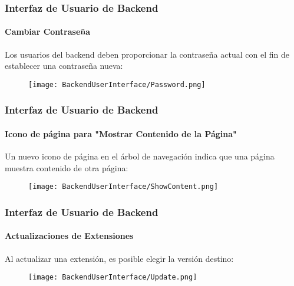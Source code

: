 \begin{frame}[fragile]
	\frametitle{Interfaz de Usuario de Backend}
	\framesubtitle{Cambiar Contraseña}

	Los usuarios del backend deben proporcionar la contraseña actual con el fin de
	establecer una contraseña nueva:

	\begin{figure}
		\texttt{[image: BackendUserInterface/Password.png]}
	\end{figure}

\end{frame}

\begin{frame}[fragile]
	\frametitle{Interfaz de Usuario de Backend}
	\framesubtitle{Icono de página para "Mostrar Contenido de la Página"}

	Un nuevo icono de página en el árbol de navegación indica que una página
	muestra contenido de otra página:

	\begin{figure}
		\texttt{[image: BackendUserInterface/ShowContent.png]}
	\end{figure}

\end{frame}

\begin{frame}[fragile]
	\frametitle{Interfaz de Usuario de Backend}
	\framesubtitle{Actualizaciones de Extensiones}

	Al actualizar una extensión, es posible elegir la versión destino:

	\begin{figure}
		\texttt{[image: BackendUserInterface/Update.png]}
	\end{figure}

\end{frame}

